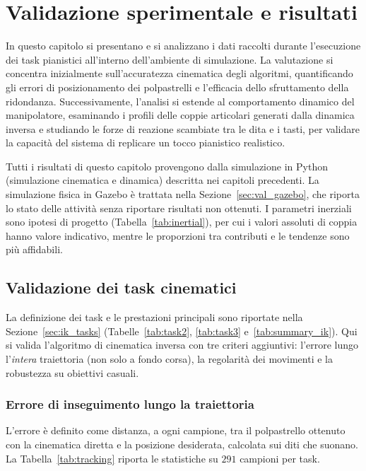\chapter{Validazione sperimentale e risultati}
\label{ch:risultati}

In questo capitolo si presentano e si analizzano i dati raccolti durante l'esecuzione dei task pianistici all'interno dell'ambiente di simulazione. La valutazione si concentra inizialmente sull'accuratezza cinematica degli algoritmi, quantificando gli errori di posizionamento dei polpastrelli e l'efficacia dello sfruttamento della ridondanza. Successivamente, l'analisi si estende al comportamento dinamico del manipolatore, esaminando i profili delle coppie articolari generati dalla dinamica inversa e studiando le forze di reazione scambiate tra le dita e i tasti, per validare la capacità del sistema di replicare un tocco pianistico realistico.

Tutti i risultati di questo capitolo provengono dalla simulazione in Python (simulazione cinematica e dinamica) descritta nei capitoli precedenti. La simulazione fisica in Gazebo è trattata nella Sezione~\ref{sec:val_gazebo}, che riporta lo stato delle attività senza riportare risultati non ottenuti. I parametri inerziali sono ipotesi di progetto (Tabella~\ref{tab:inertial}), per cui i valori assoluti di coppia hanno valore indicativo, mentre le proporzioni tra contributi e le tendenze sono più affidabili.

\section{Validazione dei task cinematici}
\label{sec:val_cinematica}

La definizione dei task e le prestazioni principali sono riportate nella Sezione~\ref{sec:ik_tasks} (Tabelle~\ref{tab:task2}, \ref{tab:task3} e~\ref{tab:summary_ik}). Qui si valida l'algoritmo di cinematica inversa con tre criteri aggiuntivi: l'errore lungo l'\emph{intera} traiettoria (non solo a fondo corsa), la regolarità dei movimenti e la robustezza su obiettivi casuali.

\subsection{Errore di inseguimento lungo la traiettoria}

L'errore è definito come distanza, a ogni campione, tra il polpastrello ottenuto con la cinematica diretta e la posizione desiderata, calcolata sui diti che suonano. La Tabella~\ref{tab:tracking} riporta le statistiche su $291$ campioni per task.

